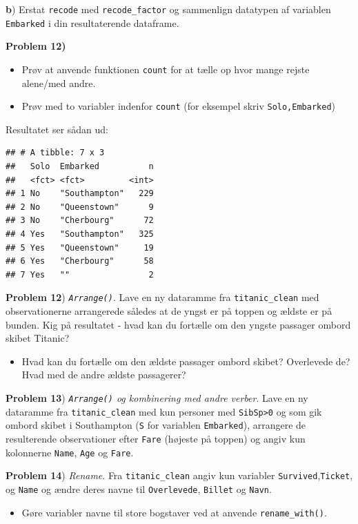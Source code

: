 \documentclass[
]{book}
\providecommand{\tightlist}{%
  \setlength{\itemsep}{0pt}\setlength{\parskip}{0pt}}
\begin{document}
\textbf{b}) Erstat \texttt{recode} med \texttt{recode\_factor} og sammenlign datatypen af variablen \texttt{Embarked} i din resultaterende dataframe.

\textbf{Problem 12)}

\begin{itemize}
\tightlist
\item
  Prøv at anvende funktionen \texttt{count} for at tælle op hvor mange rejste alene/med andre.
\item
  Prøv med to variabler indenfor \texttt{count} (for eksempel skriv \texttt{Solo,Embarked})
\end{itemize}

Resultatet ser sådan ud:

\begin{verbatim}
## # A tibble: 7 x 3
##   Solo  Embarked          n
##   <fct> <fct>         <int>
## 1 No    "Southampton"   229
## 2 No    "Queenstown"      9
## 3 No    "Cherbourg"      72
## 4 Yes   "Southampton"   325
## 5 Yes   "Queenstown"     19
## 6 Yes   "Cherbourg"      58
## 7 Yes   ""                2
\end{verbatim}

\textbf{Problem 12}) \emph{\texttt{Arrange()}}. Lave en ny dataramme fra \texttt{titanic\_clean} med observationerne arrangerede således at de yngst er på toppen og ældste er på bunden. Kig på resultatet - hvad kan du fortælle om den yngste passager ombord skibet Titanic?

\begin{itemize}
\tightlist
\item
  Hvad kan du fortælle om den ældste passager ombord skibet? Overlevede de? Hvad med de andre ældste passagerer?
\end{itemize}

\textbf{Problem 13}) \emph{\texttt{Arrange()} og kombinering med andre verber}. Lave en ny dataramme fra \texttt{titanic\_clean} med kun personer med \texttt{SibSp\textgreater{}0} og som gik ombord skibet i Southampton (\texttt{S} for variablen \texttt{Embarked}), arrangere de resulterende observationer efter \texttt{Fare} (højeste på toppen) og angiv kun kolonnerne \texttt{Name}, \texttt{Age} og \texttt{Fare}.

\textbf{Problem 14}) \emph{Rename}. Fra \texttt{titanic\_clean} angiv kun variabler \texttt{Survived},\texttt{Ticket}, og \texttt{Name} og ændre deres navne til \texttt{Overlevede}, \texttt{Billet} og \texttt{Navn}.

\begin{itemize}
\tightlist
\item
  Gøre variabler navne til store bogstaver ved at anvende \texttt{rename\_with()}.
\end{itemize}
\end{document}
